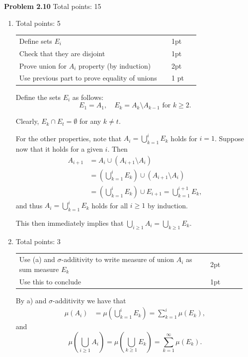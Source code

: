 \documentclass{lecturenotes}
\newcommand{\rubric}[1]{#1}
\begin{document}
\textbf{Problem 2.10} \rubric{Total points: 15}

\begin{enumerate}[label=(\alph*)]
\item \rubric{ Total points: 5 \hfill

\begin{tabular}{p{0.8\linewidth}p{0.15\linewidth}}
\hline
Define sets $E_i$ & 1pt\\
Check that they are disjoint & 1pt\\
Prove union for $A_i$ property (by induction) & 2pt\\
Use previous part to prove equality of unions & 1 pt\\
\hline
\end{tabular}

}

Define the sets $E_i$ as follows:
\[
	E_1 = A_1, \quad E_k = A_k \setminus A_{k-1} \text{ for } k \ge 2.
\]

Clearly, $E_k \cap E_t = \emptyset$ for any $k \ne t$.

For the other properties, note that $A_i = \bigcup_{k = 1}^i E_k$ holds for $i = 1$. Suppose now that it holds for a given $i$. Then
\begin{align*}
	A_{i + 1} &= A_{i} \cup (A_{i+1} \setminus A_i) \\
	&= \left(\bigcup_{k = 1}^i E_k\right) \cup (A_{i+1} \setminus A_i)\\
	&= \left(\bigcup_{k = 1}^i E_k\right) \cup E_{i+1} = \bigcup_{k = 1}^{i+1} E_k,
\end{align*}
and thus $A_i = \bigcup_{k = 1}^i E_k$ holds for all $i \ge 1$ by induction. 

This then immediately implies that $\bigcup_{i \ge 1} A_i = \bigcup_{k \ge 1} E_k$.
\item \rubric{ Total points: 3 \hfill

\begin{tabular}{p{0.8\linewidth}p{0.15\linewidth}}
\hline
Use (a) and $\sigma$-additivity to write measure of union $A_i$ as sum measure $E_k$ & 2pt\\
Use this to conclude & 1pt\\
\hline
\end{tabular}

}


By a) and $\sigma$-additivity we have that
\begin{align*}
	\mu(A_i) &= \mu\left(\bigcup_{k = 1}^i E_k\right) = \sum_{k = 1}^i \mu(E_k),
\end{align*}
and 
\[
	\mu\left(\bigcup_{i \ge 1} A_i\right) = \mu\left(\bigcup_{k \ge 1} E_k\right) = \sum_{k = 1}^\infty \mu(E_k).
\]


\end{enumerate}
\end{document}
